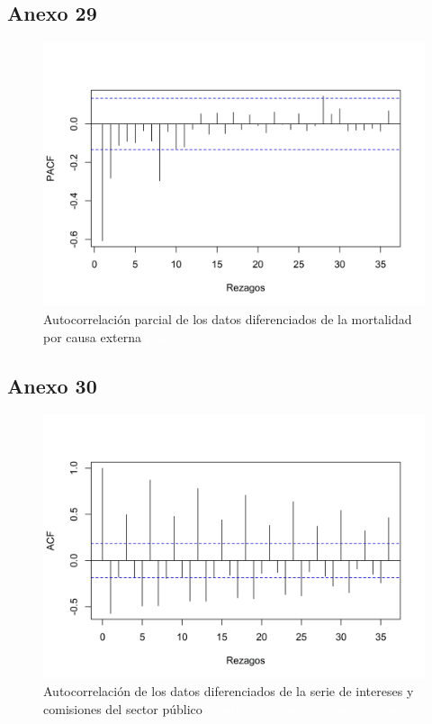 \documentclass[
]{article}
\begin{document}
\subsection{Anexo 29}

\begin{figure}[H]
\includegraphics[width=1\linewidth,height=1\textheight]{Tesis_files/figure-latex/externa_pacf-1} \caption{Autocorrelación parcial de los datos diferenciados de la mortalidad por causa externa \textcolor{white}{prueba de aaaaaaaaaaaaaaaaaaaaaaa}}\label{fig:externa_pacf}
\end{figure}

\subsection{Anexo 30}

\begin{figure}[H]
\includegraphics[width=1\linewidth,height=1\textheight]{Tesis_files/figure-latex/intereses_acf-1} \caption{Autocorrelación de los datos diferenciados de la serie de intereses y comisiones del sector público \textcolor{white}{prueba de aaaaaaaaaaaaaaaaaaaaaaa}}\label{fig:intereses_acf}
\end{figure}
\end{document}
